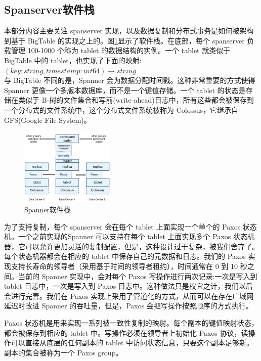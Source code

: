 \documentclass[letterpaper,twocolumn,10pt]{article}
\begin{document}
\subsection{Spanserver软件栈}
本部分内容主要关注 spanserver 实现，以及数据复制和分布式事务是如何被架构到基于 BigTable 的实现之上的。图\ref{Fig2}显示了软件栈。在底部，每个 spanserver 负载管理 100-1000 个称为 tablet 的数据结构的实例。一个 tablet 就类似于 BigTable 中的 tablet，也实现了下面的映射:\\

$(key:string, timestamp:int64) \to string$\\

与 BigTable 不同的是，Spanner 会为数据分配时间戳。这种非常重要的方式使得 Spanner 更像一个多版本数据库，而不是一个键值存储。一个 tablet 的状态是存储在类似于 B-树的文件集合和写前(write-ahead)日志中，所有这些都会被保存到一个分布式的文件系统中，这个分布式文件系统被称为 Colossus，它继承自GFS(Google File System)。

\begin{figure}[htbp]
\begin{center}
\includegraphics[width=0.4\textwidth]{./fig_2.png}
\caption{Spanner软件栈}
\label{Fig2}
\end{center}
\end{figure}

为了支持复制，每个 spanserver 会在每个 tablet 上面实现一个单个的 Paxos 状态机。一个之前实现的Spanner 可以支持在每个 tablet 上面实现多个 Paxos 状态机器，它可以允许更加灵活的复制配置，但是，这种设计过于复杂，被我们舍弃了。每个状态机器都会在相应的 tablet 中保存自己的元数据和日志。我们的 Paxos 实现支持长寿命的领导者（采用基于时间的领导者租约），时间通常在 0 到 10 秒之间。当前的 Spanner 实现中，会对每个 Paxos 写操作进行两次记录:一次是写入到 tablet 日志中，一次是写入到 Paxos 日志中。这种做法只是权宜之计，我们以后会进行完善。我们在 Paxos 实现上采用了管道化的方式，从而可以在存在广域网延迟时改进 Spanner 的吞吐量，但是，Paxos 会把写操作按照顺序的方式执行。

Paxos 状态机是用来实现一系列被一致性复制的映射。每个副本的键值映射状态，都会被保存到相应的 tablet 中。写操作必须在领导者上初始化 Paxos 协议，读操作可以直接从底层的任何副本的 tablet 中访问状态信息，只要这个副本足够新。副本的集合被称为一个 Paxos group。
\end{document}
